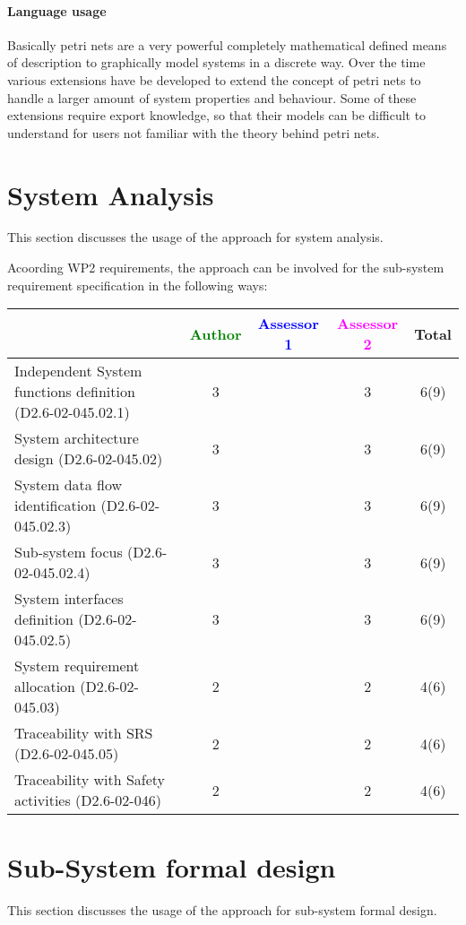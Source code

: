 \paragraph{Language usage} Basically petri nets are a very powerful completely mathematical defined means of description to graphically model systems in a discrete way. Over the time various extensions have be developed to extend the concept of petri nets to handle a larger amount of system properties and  behaviour. Some of these extensions require export knowledge, so that their models can be difficult to understand for users not familiar with the theory behind petri nets.

\section{System Analysis}
This section discusses the usage of the approach for system analysis.

Acoording WP2 requirements, the approach can be involved for the sub-system requirement specification in the following ways:

\begin{tabular}{|l | c | c | c | c|}
\hline
& \textcolor{green}{Author} & \textcolor{blue}{Assessor 1} & \textcolor{magenta}{Assessor 2} & Total \\
\hline
Independent System functions definition (D2.6-02-045.02.1)  & 3     & & 3     &  6(9) \\
\hline 
System architecture design (D2.6-02-045.02) & 3     & & 3     &  6(9) \\
\hline
System data flow identification (D2.6-02-045.02.3)  & 3     & & 3     &  6(9) \\
\hline
Sub-system focus (D2.6-02-045.02.4)  & 3     & & 3     &  6(9) \\
\hline
System interfaces definition (D2.6-02-045.02.5)  & 3     & & 3     &  6(9) \\
\hline
System requirement allocation (D2.6-02-045.03)  & 2     & & 2     &  4(6) \\
\hline
Traceability with SRS (D2.6-02-045.05)  & 2     & & 2     &  4(6) \\
\hline
Traceability with Safety activities (D2.6-02-046)  & 2     & & 2     &  4(6) \\
\hline
\end{tabular}



\section{Sub-System formal design}
This section discusses the usage of the approach for sub-system formal design.

